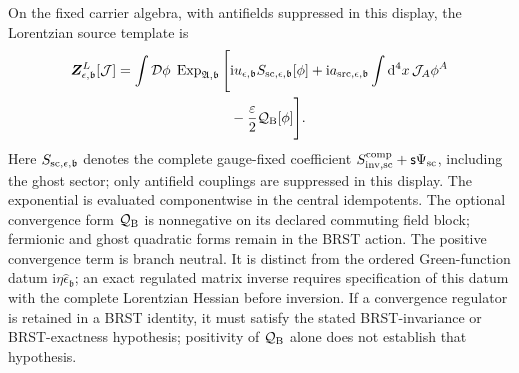 \documentclass[final,5p,times,twocolumn,numbers,nopreprintline]{elsarticle}
\numberwithin{equation}{section}
\theoremstyle{definition}
\theoremstyle{remark}
\newcommand{\dd}{\mathop{}\!\mathrm d}
\newcommand{\ii}{\mathrm i}
\newcommand{\bb}{\mathfrak b}
\newcommand{\BR}{\mathsf s}
\newcommand{\vct}[1]{\boldsymbol{#1}}
\newcommand{\epsvec}{\hat\epsilon_{\bb}}
\begin{document}
On the fixed carrier algebra, with antifields suppressed in this
display, the Lorentzian source template is
\begin{equation}
\begin{split}
 \vct Z^L_{\epsilon,\bb}[\mathcal J]
  =\int\mathcal D\phi\;
  \operatorname{Exp}_{\mathfrak A,\bb}\Bigg[
   &\ii u_{\epsilon,\bb}S_{{\rm sc},\epsilon,\bb}[\phi]
    +\ii a_{{\rm src},\epsilon,\bb}
       \int\dd^4x\,\mathcal J_A\phi^A\\
   &-\frac{\varepsilon}{2}\mathcal Q_{\rm B}[\phi]
  \Bigg].
 \label{eq:physical-L-source-functional}
\end{split}
\end{equation}
Here \(S_{{\rm sc},\epsilon,\bb}\) denotes the complete
gauge-fixed coefficient
\(S_{{\rm inv},{\rm sc}}^{\rm comp}+\BR\Psi_{\rm sc}\),
including the ghost sector; only antifield couplings are suppressed
in this display. The exponential is evaluated componentwise in the
central idempotents. The optional convergence form \(\mathcal Q_{\rm B}\)
is nonnegative on its declared commuting field block; fermionic and
ghost quadratic forms remain in the BRST action. The positive
convergence term is branch neutral. It is distinct from the ordered
Green-function datum \(\ii\eta\epsvec\); an exact regulated
matrix inverse requires specification of this datum with the
complete Lorentzian Hessian before inversion. If a convergence
regulator is retained in a BRST
identity, it must satisfy the stated BRST-invariance or BRST-exactness
hypothesis; positivity of \(\mathcal Q_{\rm B}\) alone does not
establish that hypothesis.
\end{document}
